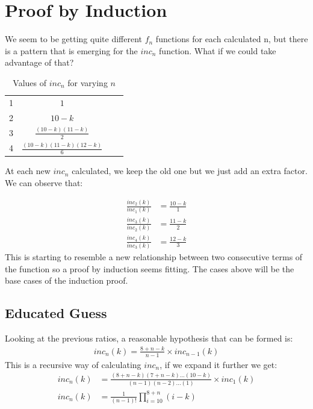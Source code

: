 \documentclass[titlepage,12pt]{article}
\begin{document}
\section{Proof by Induction}
We seem to be getting quite different $f_n$ functions for each calculated n, but there is a pattern that is emerging for the $inc_n$ function. What if we could take advantage of that?
\break
\setlength{\cellspacetoplimit}{6pt}
\setlength{\cellspacebottomlimit}{6pt}
\renewcommand{\arraystretch}{2}
\begin{table}[htb]
    \centering
        \begin{tabular}{|Sc|Sc|} 
            \hline
             &  \\
             & $1$ \\
            2 & $10-k$ \\
            3 & $\frac{(10-k)(11-k)}{2}$ \\
            4 & $\frac{(10-k)(11-k)(12-k)}{6}$ \\
            \hline
        \end{tabular}
        \caption{Values of $inc_n$ for varying $n$}
        \label{table:1}
\end{table}
\break
\noindent
At each new $inc_n$ calculated, we keep the old one but we just add an extra factor. We can observe that:

\begin{align*}
    \frac{inc_2(k)}{inc_1(k)} &= \frac{10-k}{1}\\
    \frac{inc_3(k)}{inc_2(k)} &= \frac{11-k}{2}\\
    \frac{inc_4(k)}{inc_3(k)} &= \frac{12-k}{3}
\end{align*}
This is starting to resemble a new relationship between two consecutive terms of the function so a proof by induction seems fitting. The cases above will be the base cases of the induction proof.

\subsection{Educated Guess}
Looking at the previous ratios, a reasonable hypothesis that can be formed is:
\begin{align*}
    inc_n(k) =  \frac{8+n-k}{n-1} \times inc_{n-1}(k)
\end{align*}
This is a recursive way of calculating $inc_n$, if we expand it further we get:
\begin{align*}
    inc_n(k) &=  \frac{(8+n-k)(7+n-k)...(10-k)}{(n-1)(n-2)...(1)} \times inc_{1}(k)\\
    inc_n(k) &= \frac{1}{(n-1)!} \prod_{i=10}^{8+n} (i-k)
\end{align*}
\end{document}
